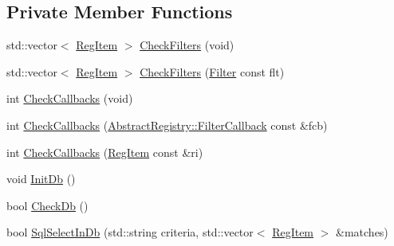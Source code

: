 \subsection*{Private Member Functions}
\begin{DoxyCompactItemize}
\item 
std\+::vector$<$ \hyperlink{classregistry_1_1RegItem}{Reg\+Item} $>$ \hyperlink{classregistry_1_1RegistryImplSQLite_a567444904255035f5b13feb8fd4c3ddd}{Check\+Filters} (void)
\item 
std\+::vector$<$ \hyperlink{classregistry_1_1RegItem}{Reg\+Item} $>$ \hyperlink{classregistry_1_1RegistryImplSQLite_a75eb46a6b3fb0f1abd01e409d989462d}{Check\+Filters} (\hyperlink{classregistry_1_1Filter}{Filter} const flt)
\item 
int \hyperlink{classregistry_1_1RegistryImplSQLite_a09fbc2f21027ef2d129350173fc81c61}{Check\+Callbacks} (void)
\item 
int \hyperlink{classregistry_1_1RegistryImplSQLite_af65ab0ea80408ceb2f18705ca8f3a463}{Check\+Callbacks} (\hyperlink{classregistry_1_1AbstractRegistry_a31f6bef634dcd324efebaf55f99b950f}{Abstract\+Registry\+::\+Filter\+Callback} const \&fcb)
\item 
int \hyperlink{classregistry_1_1RegistryImplSQLite_abca7604f13519e5a93632550e7b309dd}{Check\+Callbacks} (\hyperlink{classregistry_1_1RegItem}{Reg\+Item} const \&ri)
\item 
void \hyperlink{classregistry_1_1RegistryImplSQLite_a4a9f3255a1af40969b914e3bc5707874}{Init\+Db} ()
\item 
bool \hyperlink{classregistry_1_1RegistryImplSQLite_afa1e3fb05442de7d3d13887e33b972c0}{Check\+Db} ()
\item 
bool \hyperlink{classregistry_1_1RegistryImplSQLite_ab3bfdd5ea39fb7b0a4e621a082ddece1}{Sql\+Select\+In\+Db} (std\+::string criteria, std\+::vector$<$ \hyperlink{classregistry_1_1RegItem}{Reg\+Item} $>$ \&matches)
\end{DoxyCompactItemize}
